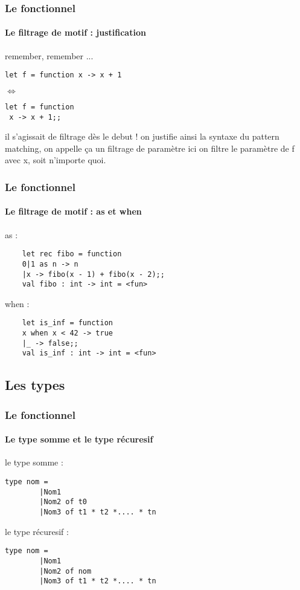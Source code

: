 \begin{frame}[fragile]
  \frametitle{Le fonctionnel}
  \framesubtitle{Le filtrage de motif : justification}
remember, remember ...
\begin{lstlisting}
let f = function x -> x + 1 
\end{lstlisting}
\begin{center}
\begin{rotate}{90}
$\Leftrightarrow$
\end{rotate}
\end{center}
\begin{lstlisting}
let f = function 
 x -> x + 1;;
 \end{lstlisting}
  il s'agissait de filtrage dès le debut ! on justifie ainsi la syntaxe du pattern matching, 
  on appelle ça un filtrage de paramètre ici on filtre le paramètre de f avec x, soit n'importe quoi.
\end{frame}

\begin{frame}[fragile]
  \frametitle{Le fonctionnel}
  \framesubtitle{Le filtrage de motif : as et when}
  \begin{itemize}
  \begin{minipage}[t]{5cm}
  \item
    as :
    \begin{lstlisting}
	let rec fibo = function 
 	0|1 as n -> n 
 	|x -> fibo(x - 1) + fibo(x - 2);; 
	val fibo : int -> int = <fun>
    \end{lstlisting}
  \end{minipage}
  \begin{minipage}[t]{5cm}
  \item
    when :
    \begin{lstlisting}
	let is_inf = function 
  	x when x < 42 -> true
 	|_ -> false;;
	val is_inf : int -> int = <fun>
    \end{lstlisting}
  \end{minipage}
  \end{itemize}
\end{frame}
      \subsection{Les types}
\begin{frame}[fragile]
	\frametitle{Le fonctionnel}
	\framesubtitle{Le type somme et le type récuresif}
	le type somme :
	\begin{lstlisting}
type nom =
        |Nom1 
        |Nom2 of t0 
        |Nom3 of t1 * t2 *.... * tn 
	\end{lstlisting}
	le type récuresif :
	\begin{lstlisting}
type nom =
        |Nom1
        |Nom2 of nom
        |Nom3 of t1 * t2 *.... * tn
         \end{lstlisting}
\end{frame}

